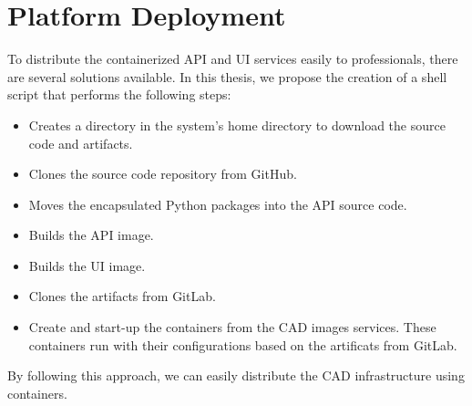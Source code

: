 \section{Platform Deployment}

To distribute the containerized API and UI services easily to professionals,
there are several solutions available. In this thesis, we propose the creation
of a shell script that performs the following steps:

\begin{itemize}
  \item Creates a directory in the system's home directory to download the source code and artifacts.
  \item Clones the source code repository from GitHub.
  \item Moves the encapsulated Python packages into the API source code.
  \item Builds the API image.
  \item Builds the UI image.
  \item Clones the artifacts from GitLab.
  \item Create and start-up the containers from the CAD images services. These
    containers run with their configurations based on the artificats from
    GitLab.
\end{itemize}

By following this approach, we can easily distribute the CAD infrastructure
using containers.
